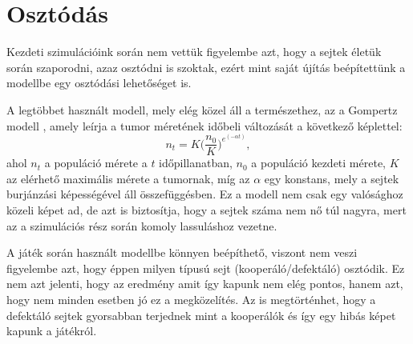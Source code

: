 \section{Osztódás}
Kezdeti szimulációink során nem vettük figyelembe azt, hogy a sejtek életük során szaporodni, azaz osztódni is szoktak, ezért mint saját újítás beépítettünk a modellbe egy osztódási lehetőséget is. 

A legtöbbet használt modell, mely elég közel áll a természethez, az a Gompertz modell \cite{wiki:gompertz}, amely leírja a tumor méretének időbeli változását a következő képlettel:
\begin{equation}
	\label{eq:gompertz}
	n_t = K \bigg(\frac{n_0}{K} \bigg) ^ {e^{(- \alpha t)}},
\end{equation}
ahol $n_t$ a populáció mérete a $t$ időpillanatban, $n_0$ a populáció kezdeti mérete, $K$ az elérhető maximális mérete a tumornak, míg az $\alpha$ egy konstans, mely a sejtek burjánzási képességével áll összefüggésben. Ez a modell nem csak egy valósághoz közeli képet ad, de azt is biztosítja, hogy a sejtek száma nem nő túl nagyra, mert az a szimulációs rész során komoly lassuláshoz vezetne. 

A játék során használt modellbe könnyen beépíthető, viszont nem veszi figyelembe azt, hogy éppen milyen típusú sejt (kooperáló/defektáló) osztódik. Ez nem azt jelenti, hogy az eredmény amit így kapunk nem elég pontos, hanem azt, hogy nem minden esetben jó ez a megközelítés. Az is megtörténhet, hogy a defektáló sejtek gyorsabban terjednek mint a kooperálók és így egy hibás képet kapunk a játékról.